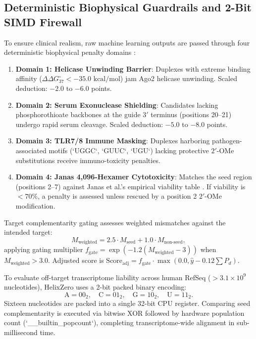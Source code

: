 \documentclass[twocolumn]{article}
\begin{document}
\subsection{Deterministic Biophysical Guardrails and 2-Bit SIMD Firewall}
To ensure clinical realism, raw machine learning outputs are passed through four deterministic biophysical penalty domains \cite{sakamuri2020serum,janas2018selection,uppuladinne2019jbsd}:
\begin{enumerate}
    \item \textbf{Domain 1: Helicase Unwinding Barrier}: Duplexes with extreme binding affinity ($\Delta\Delta G^\circ_{37} < -35.0\text{ kcal/mol}$) jam Ago2 helicase unwinding. Scaled deduction: $-2.0$ to $-6.0$ points.
    \item \textbf{Domain 2: Serum Exonuclease Shielding}: Candidates lacking phosphorothioate backbones at the guide $3'$ terminus (positions 20--21) undergo rapid serum cleavage. Scaled deduction: $-5.0$ to $-8.0$ points.
    \item \textbf{Domain 3: TLR7/8 Immune Masking}: Duplexes harboring pathogen-associated motifs (`UGGC`, `GUUC`, `UGU`) lacking protective $2'$-OMe substitutions receive immuno-toxicity penalties.
    \item \textbf{Domain 4: Janas 4,096-Hexamer Cytotoxicity}: Matches the seed region (positions 2--7) against Janas et al.'s empirical viability table \cite{janas2018selection}. If viability is $< 70\%$, a penalty is assessed unless rescued by a position 2 $2'$-OMe modification.
\end{enumerate}
Target complementarity gating assesses weighted mismatches against the intended target:
\begin{equation}
M_{\text{weighted}} = 2.5 \cdot M_{\text{seed}} + 1.0 \cdot M_{\text{non-seed}},
\end{equation}
applying gating multiplier $f_{\text{gate}} = \exp(-1.2(M_{\text{weighted}}-3))$ when $M_{\text{weighted}} > 3.0$. Adjusted score is $\text{Score}_{\text{adj}} = f_{\text{gate}} \cdot \max(0.0, \hat{y} - 0.12 \sum P_d)$.

To evaluate off-target transcriptome liability across human RefSeq ($> 3.1 \times 10^9$ nucleotides), HelixZero uses a 2-bit packed binary encoding:
\begin{equation}
\text{A} = 00_2, \quad \text{C} = 01_2, \quad \text{G} = 10_2, \quad \text{U} = 11_2.
\end{equation}
Sixteen nucleotides are packed into a single 32-bit CPU register. Comparing seed complementarity is executed via bitwise XOR followed by hardware population count (`__builtin_popcount`), completing transcriptome-wide alignment in sub-millisecond time.
\end{document}
